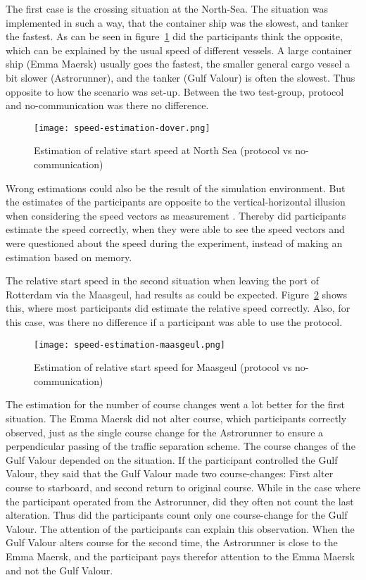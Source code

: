 The first case is the crossing situation at the North-Sea. The situation was implemented in such a way, that the container ship was the slowest, and tanker the fastest. As can be seen in figure~\ref{fig:speed-estimation-dover} did the participants think the opposite, which can be explained by the usual speed of different vessels. A large container ship (Emma Maersk) usually goes the fastest, the smaller general cargo vessel a bit slower (Astrorunner), and the tanker (Gulf Valour) is often the slowest. Thus opposite to how the scenario was set-up. Between the two test-group, protocol and no-communication was there no difference.

\begin{figure}[h]
	\centering
	\texttt{[image: speed-estimation-dover.png]}
	\caption{Estimation of relative start speed at North Sea (protocol vs no-communication)}
	\label{fig:speed-estimation-dover}
\end{figure}

Wrong estimations could also be the result of the simulation environment. But the estimates of the participants are opposite to the vertical-horizontal illusion when considering the speed vectors as measurement \cite{Prinzmetal1993}. Thereby did participants estimate the speed correctly, when they were able to see the speed vectors and were questioned about the speed during the experiment, instead of making an estimation based on memory.

The relative start speed in the second situation when leaving the port of Rotterdam via the Maasgeul, had results as could be expected. Figure~\ref{fig:speed-estimation-maasgeul} shows this, where most participants did estimate the relative speed correctly. Also, for this case, was there no difference if a participant was able to use the protocol.

\begin{figure}[h]
	\centering
	\texttt{[image: speed-estimation-maasgeul.png]}
	\caption{Estimation of relative start speed for Maasgeul (protocol vs no-communication)}
	\label{fig:speed-estimation-maasgeul}
\end{figure}

The estimation for the number of course changes went a lot better for the first situation. The Emma Maersk did not alter course, which participants correctly observed, just as the single course change for the Astrorunner to ensure a perpendicular passing of the traffic separation scheme. The course changes of the Gulf Valour depended on the situation. If the participant controlled the Gulf Valour, they said that the Gulf Valour made two course-changes: First alter course to starboard, and second return to original course. While in the case where the participant operated from the Astrorunner, did they often not count the last alteration. Thus did the participants count only one course-change for the Gulf Valour. The attention of the participants can explain this observation. When the Gulf Valour alters course for the second time, the Astrorunner is close to the Emma Maersk, and the participant pays therefor attention to the Emma Maersk and not the Gulf Valour.

